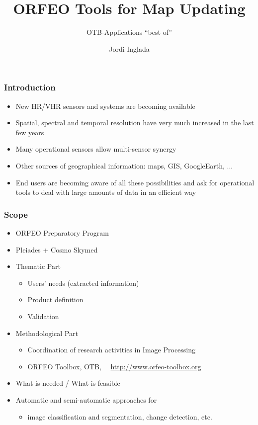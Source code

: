 \documentclass[compress]{beamer}
\title{ORFEO Tools for Map Updating}
\subtitle{OTB-Applications ``best of''} %
\author
{Jordi Inglada}
\institute[Cnes] %
{\textsc{Centre national d'\'etudes spatiales}}
\date{}
\begin{document}
\begin{frame}
  \titlepage
\end{frame}

\begin{frame}
    \frametitle{Introduction}
  \begin{itemize}
    \item New HR/VHR sensors and systems are becoming available
    \item Spatial, spectral and temporal resolution have very much
    increased in the last few years
  \item Many operational sensors allow multi-sensor synergy
    \item Other sources of geographical information: maps, GIS,
    GoogleEarth, ...
  \item End users are becoming aware of all these possibilities and
  ask for operational tools to deal with large amounts of data in an
  efficient way
  \end{itemize}
\end{frame}

\begin{frame}
\frametitle{Scope}
\begin{itemize}
  \item ORFEO Preparatory Program
    \item Pleiades + Cosmo Skymed
    \item Thematic Part
      \begin{itemize}
	\item Users' needs (extracted information)
	\item Product definition
	\item Validation
      \end{itemize}
    \item Methodological Part
    \begin{itemize}
    \item Coordination of research activities in Image Processing
    \item ORFEO Toolbox, OTB,~ ~\url{http://www.orfeo-toolbox.org}
    \end{itemize}
    \item What is needed / What is feasible
    \item Automatic and semi-automatic approaches for
      \begin{itemize}
      \item image classification and segmentation, change detection, etc.
      \end{itemize}
 \end{itemize}
\end{frame}
\end{document}
